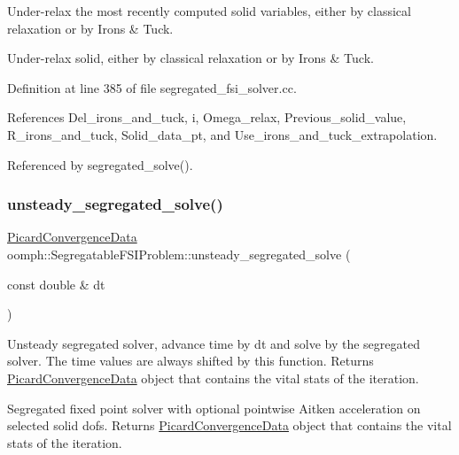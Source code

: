 Under-\/relax the most recently computed solid variables, either by classical relaxation or by Irons \& Tuck. 

Under-\/relax solid, either by classical relaxation or by Irons \& Tuck. 

Definition at line 385 of file segregated\+\_\+fsi\+\_\+solver.\+cc.



References Del\+\_\+irons\+\_\+and\+\_\+tuck, i, Omega\+\_\+relax, Previous\+\_\+solid\+\_\+value, R\+\_\+irons\+\_\+and\+\_\+tuck, Solid\+\_\+data\+\_\+pt, and Use\+\_\+irons\+\_\+and\+\_\+tuck\+\_\+extrapolation.



Referenced by segregated\+\_\+solve().

\mbox{\label{classoomph_1_1SegregatableFSIProblem_aae43b43dbc197d238535bcb5c3acf168}} 
\subsubsection{\texorpdfstring{unsteady\+\_\+segregated\+\_\+solve()}{unsteady\_segregated\_solve()}\hspace{0.1cm}{\footnotesize\ttfamily [1/2]}}
{\footnotesize\ttfamily \hyperlink{classoomph_1_1PicardConvergenceData}{Picard\+Convergence\+Data} oomph\+::\+Segregatable\+F\+S\+I\+Problem\+::unsteady\+\_\+segregated\+\_\+solve (\begin{DoxyParamCaption}\item[{const double \&}]{dt }\end{DoxyParamCaption})}



Unsteady segregated solver, advance time by dt and solve by the segregated solver. The time values are always shifted by this function. Returns \hyperlink{classoomph_1_1PicardConvergenceData}{Picard\+Convergence\+Data} object that contains the vital stats of the iteration. 

Segregated fixed point solver with optional pointwise Aitken acceleration on selected solid dofs. Returns \hyperlink{classoomph_1_1PicardConvergenceData}{Picard\+Convergence\+Data} object that contains the vital stats of the iteration. 

